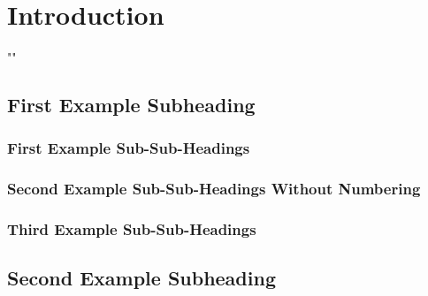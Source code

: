 \section{Introduction}

"\lipsum[1-1]"

\subsection{First Example Subheading}

\subsubsection{First Example Sub-Sub-Headings}

\subsubsection*{Second Example Sub-Sub-Headings Without Numbering}

\subsubsection{Third Example Sub-Sub-Headings}

\subsection{Second Example Subheading}
